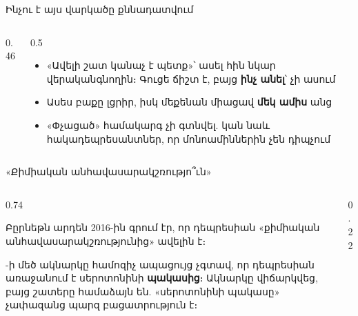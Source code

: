 \begin{frame}{Ինչու է այս վարկածը քննադատվում}
  \begin{columns}[c]
    \begin{column}{0.46\textwidth}
      \centering
      
    \end{column}
    \begin{column}{0.5\textwidth}
      \begin{itemize}
        \item «Ավելի շատ կանաչ է պետք»՝ ասել հին նկար վերականգնողին։ Գուցե ճիշտ է, բայց \textbf{ինչ անել}՝ չի ասում 
        \item<2-> Ասես բաքը լցրիր, իսկ մեքենան միացավ \textbf{մեկ ամիս} անց 
        \item<3-> «Փչացած» համակարգ չի գտնվել. կան նաև հակադեպրեսանտներ, որ մոնոամիններին չեն դիպչում
      \end{itemize}
    \end{column}
  \end{columns}
\end{frame}

\begin{frame}{«Քիմիական անհավասարակշռությո՞ւն»}
  \begin{columns}[c]
    \begin{column}{0.74\textwidth}
      \begin{scienceupdate}
        Բըրնեթն արդեն 2016-ին գրում էր, որ դեպրեսիան «քիմիական անհավասարակշռությունից» ավելին է։\par{}-ի մեծ ակնարկը համոզիչ ապացույց չգտավ, որ դեպրեսիան առաջանում է սերոտոնինի \textbf{պակասից}։ Ակնարկը վիճարկվեց, բայց շատերը համաձայն են. «սերոտոնինի պակասը» չափազանց պարզ բացատրություն է։\par\smallskip
      \end{scienceupdate}
    \end{column}
    \begin{column}{0.22\textwidth}
      \centering{}
    \end{column}
  \end{columns}
\end{frame}


